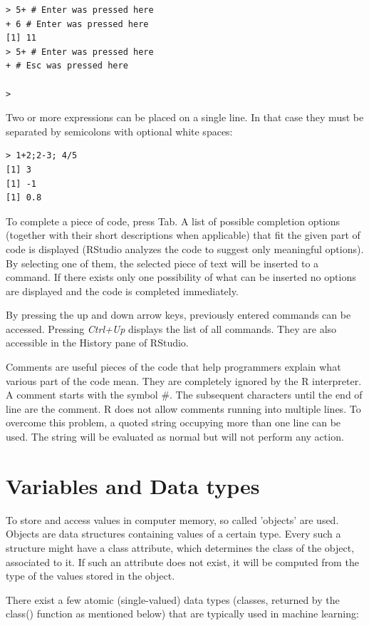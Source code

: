 \documentclass[11pt,openany,executivepaper]{book}
\begin{document}
\begin{verbatim}
> 5+ # Enter was pressed here
+ 6 # Enter was pressed here
[1] 11
> 5+ # Enter was pressed here
+ # Esc was pressed here

>
\end{verbatim}

Two or more expressions can be placed on a single line. In that case they must be separated by semicolons with optional white spaces:

\begin{verbatim}
> 1+2;2-3; 4/5
[1] 3
[1] -1
[1] 0.8
\end{verbatim}

To complete a piece of code, press Tab. A list of possible completion options (together with their short descriptions when applicable) that fit the given part of code is displayed (RStudio analyzes the code to suggest only meaningful options). By selecting one of them, the selected piece of text will be inserted to a command. If there exists only one possibility of what can be inserted no options are displayed and the code is completed immediately.

By pressing the up and down arrow keys, previously entered commands can be accessed. Pressing \textit{Ctrl+Up} displays the list of all commands. They are also accessible in the History pane of RStudio.

Comments are useful pieces of the code that help programmers explain what various part of the code mean. They are completely ignored by the R interpreter. A comment starts with the symbol \#. The subsequent characters until the end of line are the comment. R does not allow comments running into multiple lines. To overcome this problem, a quoted string occupying more than one line can be used. The string will be evaluated as normal but will not perform any action.

\section{Variables and Data types}
To store and access values in computer memory, so called 'objects' are used. Objects are data structures containing values of a certain type. Every such a structure might have a class attribute, which determines the class of the object, associated to it. If such an attribute does not exist, it will be computed from the type of the values stored in the object.

There exist a few atomic (single-valued) data types (classes, returned by the class() function as mentioned below) that are typically used in machine learning:
\end{document}

